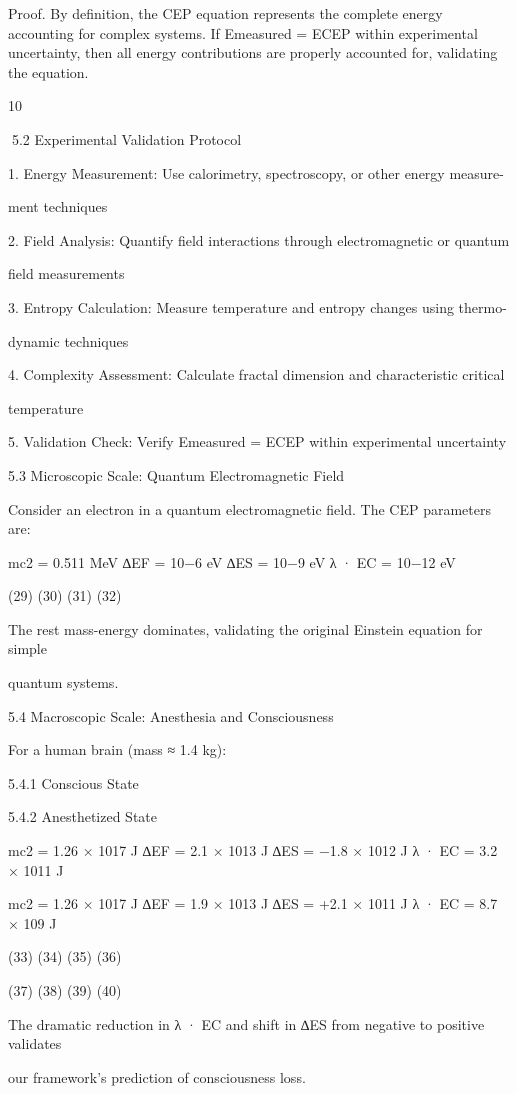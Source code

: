 Proof. By definition, the CEP equation represents the complete energy accounting for
complex systems. If Emeasured = ECEP within experimental uncertainty, then all energy
contributions are properly accounted for, validating the equation.

10

5.2 Experimental Validation Protocol

1. Energy Measurement: Use calorimetry, spectroscopy, or other energy measure-

ment techniques

2. Field Analysis: Quantify field interactions through electromagnetic or quantum

field measurements

3. Entropy Calculation: Measure temperature and entropy changes using thermo-

dynamic techniques

4. Complexity Assessment: Calculate fractal dimension and characteristic critical

temperature

5. Validation Check: Verify Emeasured = ECEP within experimental uncertainty

5.3 Microscopic Scale: Quantum Electromagnetic Field

Consider an electron in a quantum electromagnetic field. The CEP parameters are:

mc2 = 0.511 MeV
∆EF = 10−6 eV
∆ES = 10−9 eV
λ · EC = 10−12 eV

(29)
(30)
(31)
(32)

The rest mass-energy dominates, validating the original Einstein equation for simple

quantum systems.

5.4 Macroscopic Scale: Anesthesia and Consciousness

For a human brain (mass ≈ 1.4 kg):

5.4.1 Conscious State

5.4.2 Anesthetized State

mc2 = 1.26 × 1017 J
∆EF = 2.1 × 1013 J
∆ES = −1.8 × 1012 J
λ · EC = 3.2 × 1011 J

mc2 = 1.26 × 1017 J
∆EF = 1.9 × 1013 J
∆ES = +2.1 × 1011 J
λ · EC = 8.7 × 109 J

(33)
(34)
(35)
(36)

(37)
(38)
(39)
(40)

The dramatic reduction in λ · EC and shift in ∆ES from negative to positive validates

our framework’s prediction of consciousness loss.


